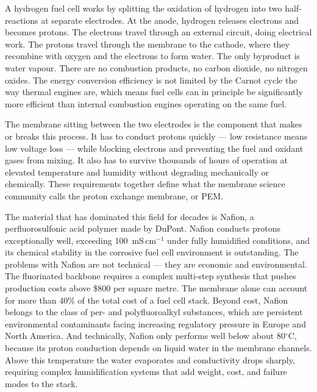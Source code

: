 \documentclass[12pt,a4paper]{report}
\begin{document}
A hydrogen fuel cell works by splitting the oxidation of 
hydrogen into two half-reactions at separate electrodes. 
At the anode, hydrogen releases electrons and becomes 
protons. The electrons travel through an external circuit, 
doing electrical work. The protons travel through the 
membrane to the cathode, where they recombine with oxygen 
and the electrons to form water. The only byproduct is 
water vapour. There are no combustion products, no carbon 
dioxide, no nitrogen oxides. The energy conversion 
efficiency is not limited by the Carnot cycle the way 
thermal engines are, which means fuel cells can in 
principle be significantly more efficient than internal 
combustion engines operating on the same fuel.\cite{1,2}

The membrane sitting between the two electrodes is the 
component that makes or breaks this process. It has to 
conduct protons quickly — low resistance means low 
voltage loss — while blocking electrons and preventing 
the fuel and oxidant gases from mixing. It also has to 
survive thousands of hours of operation at elevated 
temperature and humidity without degrading 
mechanically or chemically. These requirements together 
define what the membrane science community calls the 
proton exchange membrane, or PEM.\cite{3,4}

The material that has dominated this field for decades 
is Nafion, a perfluorosulfonic acid polymer made by 
DuPont. Nafion conducts protons exceptionally well, 
exceeding 100~mS\,cm\(^{-1}\) under fully humidified 
conditions, and its chemical stability in the corrosive 
fuel cell environment is outstanding.\cite{5,6} The 
problems with Nafion are not technical — they are 
economic and environmental. The fluorinated backbone 
requires a complex multi-step synthesis that pushes 
production costs above \$800 per square metre. The 
membrane alone can account for more than 40\% of the 
total cost of a fuel cell stack.\cite{1,4} Beyond cost, 
Nafion belongs to the class of per- and polyfluoroalkyl 
substances, which are persistent environmental 
contaminants facing increasing regulatory pressure in 
Europe and North America.\cite{24} And technically, 
Nafion only performs well below about 80\(^\circ\)C, 
because its proton conduction depends on liquid water 
in the membrane channels. Above this temperature the 
water evaporates and conductivity drops sharply, 
requiring complex humidification systems that add 
weight, cost, and failure modes to the 
stack.\cite{3,4,5}
\end{document}
